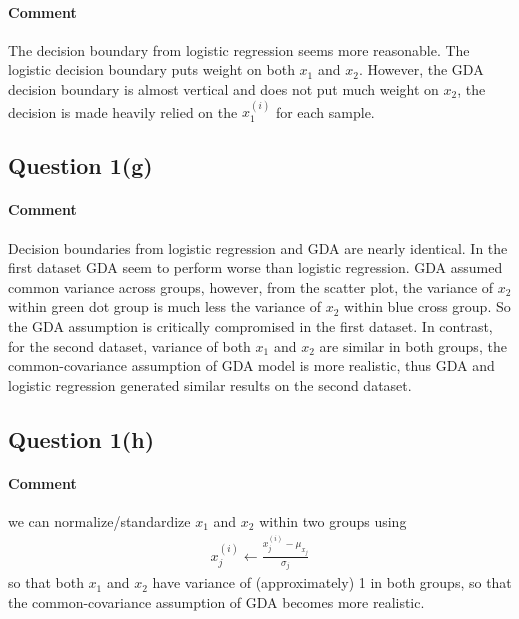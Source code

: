\documentclass[11pt]{article}
\newcommand{\upi}[0]{^{(i)}}
\begin{document}
	\paragraph{Comment} The decision boundary from logistic regression seems more reasonable. The logistic decision boundary puts weight on both $x_1$ and $x_2$. However, the GDA decision boundary is almost vertical and does not put much weight on $x_2$, the decision is made heavily relied on the $x_1\upi$ for each sample.
	
	\newpage
	\subsection{Question 1(g)}
%

	\paragraph{Comment} Decision boundaries from logistic regression and GDA are nearly identical. In the first dataset GDA seem to perform worse than logistic regression. GDA assumed common variance across groups, however, from the scatter plot, the variance of $x_2$ within green dot group is much less the variance of $x_2$ within blue cross group. So the GDA assumption is critically compromised in the first dataset. In contrast, for the second dataset, variance of both $x_1$ and $x_2$ are similar in both groups, the common-covariance assumption of GDA model is more realistic, thus GDA and logistic regression generated similar results on the second dataset.
	
	\newpage
	\subsection{Question 1(h)}
	\paragraph{Comment} we can normalize/standardize $x_1$ and $x_2$ within two groups using 
	\begin{align}
		x\upi_j \leftarrow \frac{x\upi_j - \mu_{x_j}}{\sigma_j}
	\end{align}
	so that both $x_1$ and $x_2$ have variance of (approximately) 1 in both groups, so that the common-covariance assumption of GDA becomes more realistic.
	
\end{document}
